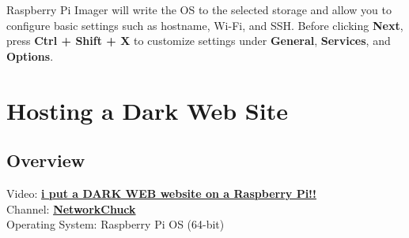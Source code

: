 \documentclass[a4paper,12pt]{article}
\begin{document}
Raspberry Pi Imager will write the OS to the selected storage and allow you to configure basic settings such as hostname, Wi-Fi, and SSH. Before clicking \textbf{Next}, press \textbf{Ctrl + Shift + X} to customize settings under \textbf{General}, \textbf{Services}, and \textbf{Options}.

\section{Hosting a Dark Web Site}

\subsection{Overview}
Video: \href{https://www.youtube.com/watch?v=bllS9tkCkaM}{\textbf{\color{blue}i put a DARK WEB website on a Raspberry Pi!!}} \\
Channel: \href{https://www.youtube.com/@NetworkChuck}{\textbf{\color{blue}NetworkChuck}} \\
Operating System: Raspberry Pi OS (64-bit)
\end{document}
